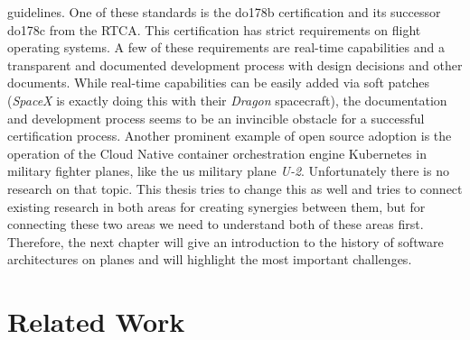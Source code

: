 \documentclass[titlepage]{report}
\begin{document}
guidelines. One of these standards is the \gls{do178b} certification and its successor \gls{do178c} from the \gls{RTCA}. 
This certification has strict requirements on flight operating systems. A few of these requirements are real-time capabilities
and a transparent and documented development process with design decisions and other documents. While
real-time capabilities can be easily added via soft patches (\emph{SpaceX} is exactly doing this with their
\emph{Dragon} spacecraft\cite{gruen2012linux}), the documentation and development process seems to be an invincible
obstacle for a successful certification process. Another prominent example of open source adoption is the operation
of the Cloud Native container orchestration engine Kubernetes in military fighter planes, like the \gls{us} military
plane \emph{U-2}\cite{U2Kubernetes}. Unfortunately there is no research on that topic. This thesis tries to change this
as well and tries to connect existing research in both areas for creating synergies between them, but for connecting
these two areas we need to understand both of these areas first. 
Therefore, the next chapter will give an introduction to the history of software architectures on planes and will highlight the 
most important challenges.

\chapter{Related Work}\label{chapter:related_work}
\end{document}
